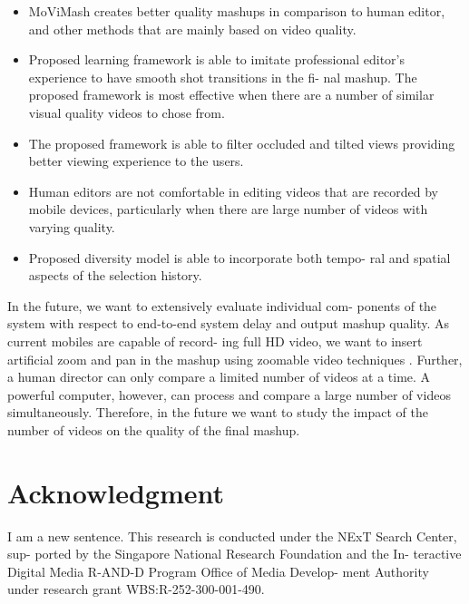 \documentclass{sig-alternate}
\begin{document}
\begin{itemize}
\item MoViMash creates better quality mashups in comparison to
human editor, and other methods that are mainly based on
video quality.
\item Proposed learning framework is able to imitate professional
editor’s experience to have smooth shot transitions in the fi-
nal mashup. The proposed framework is most effective when
there are a number of similar visual quality videos to chose
from.
\item The proposed framework is able to filter occluded and tilted
views providing better viewing experience to the users.
\item Human editors are not comfortable in editing videos that are
recorded by mobile devices, particularly when there are large
number of videos with varying quality.
\item Proposed diversity model is able to incorporate both tempo-
ral and spatial aspects of the selection history.
\end{itemize}
In the future, we want to extensively evaluate individual com-
ponents of the system with respect to end-to-end system delay and
output mashup quality. As current mobiles are capable of record-
ing full HD video, we want to insert artificial zoom and pan in the
mashup using zoomable video techniques \cite{salas:eleven}. Further, a human
director can only compare a limited number of videos at a time.
A powerful computer, however, can process and compare a large
number of videos simultaneously. Therefore, in the future we want
to study the impact of the number of videos on the quality of the
final mashup.

\section*{Acknowledgment}
I am a new sentence.
This research is conducted under the NExT Search Center, sup-
ported by the Singapore National Research Foundation and the In-
teractive Digital Media R-AND-D Program Office of Media Develop-
ment Authority under research grant WBS:R-252-300-001-490.




%

\end{document}
